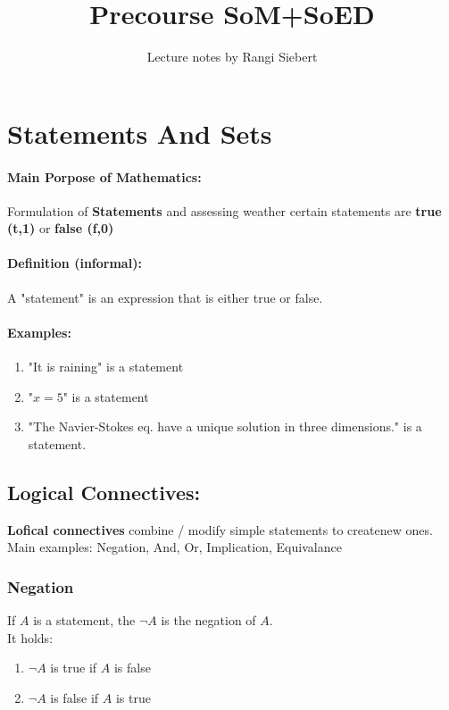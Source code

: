 \documentclass[twocolumn]{article}
\begin{document}
\title{Precourse SoM+SoED}
\author{Lecture notes by Rangi Siebert}
\maketitle
\tableofcontents

\section{Statements And Sets}
			\paragraph{Main Porpose of Mathematics:}
			Formulation of \textbf{Statements} and assessing weather certain 
			statements are \textbf{true (t,1)} or \textbf{false (f,0)} 

			\paragraph{Definition (informal):}
			A "statement" is an expression that is either true or false.

			\paragraph{Examples:}
			\begin{enumerate}
				\item "It is raining" is a statement
				\item "$x=5$" is a statement
				\item "The Navier-Stokes eq. have a unique solution in 
					three dimensions." is a statement.
			\end{enumerate}

	\subsection{Logical Connectives:}
		\textbf{Lofical connectives} combine / modify simple statements to 
		createnew ones. Main examples: Negation, And, Or, Implication, Equivalance

		\subsubsection{Negation}
			If $A$ is a statement, the $\neg A$ is the negation of $A$.\\
			It holds:
			\begin{enumerate}
				\item $\neg A$ is true if $A$ is false
				\item $\neg A$ is false if $A$ is true
			\end{enumerate}
\end{document}
